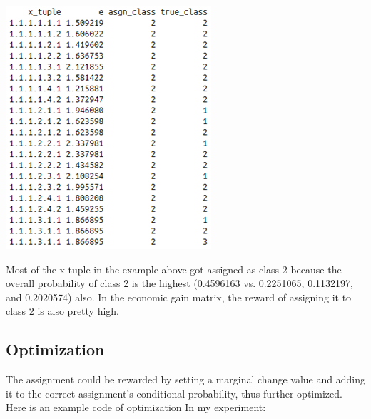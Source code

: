 \documentclass{article}
\begin{document}
\begin{multicols}{2}
\includegraphics{fig10.png}

Most of the x tuple in the example above got assigned as class 2 because the overall probability of class 2 is the highest (0.4596163 vs. 0.2251065, 0.1132197, and 0.2020574) also. In the economic gain matrix, the reward of assigning it to class 2 is also pretty high.
\subsection{Optimization}
The assignment could be rewarded by setting a marginal change value and adding it to the correct assignment's conditional probability, thus further optimized.
Here is an example code of optimization In my experiment:


\end{multicols}
\end{document}
